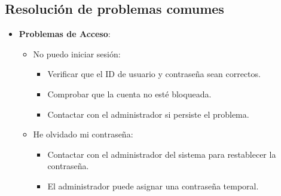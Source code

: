 \subsection{Resolución de problemas comumes}

\begin{itemize}
   \item \textbf{Problemas de Acceso}:
   \begin{itemize}
      \item No puedo iniciar sesión:
      \begin{itemize}
         \item Verificar que el ID de usuario y contraseña sean correctos.
         \item Comprobar que la cuenta no esté bloqueada.
         \item Contactar con el administrador si persiste el problema.
      \end{itemize}
      \item He olvidado mi contraseña:
      \begin{itemize}
         \item Contactar con el administrador del sistema para restablecer la contraseña.
         \item El administrador puede asignar una contraseña temporal.
      \end{itemize}
   \end{itemize}


\end{itemize}
